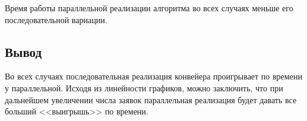 Время работы параллельной реализации алгоритма во всех случаях меньше его последовательной вариации.

\subsection*{Вывод}
Во всех случаях последовательная реализация конвейера проигрывает по времени у параллельной.
Исходя из линейности графиков, можно заключить, что при дальнейшем увеличении числа заявок параллельная реализация будет давать все больший <<выигрышь>> по времени.
